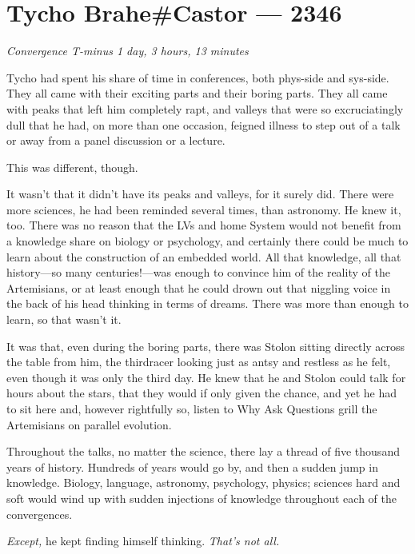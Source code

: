 \hypertarget{tycho-brahecastor-2346}{%
\chapter{Tycho Brahe\#Castor — 2346}}

\begin{center}
\emph{Convergence T-minus 1 day, 3 hours, 13 minutes}
\end{center}

\noindent Tycho had spent his share of time in conferences, both phys-side and sys-side. They all came with their exciting parts and their boring parts. They all came with peaks that left him completely rapt, and valleys that were so excruciatingly dull that he had, on more than one occasion, feigned illness to step out of a talk or away from a panel discussion or a lecture.

This was different, though.

It wasn't that it didn't have its peaks and valleys, for it surely did. There were more sciences, he had been reminded several times, than astronomy. He knew it, too. There was no reason that the LVs and home System would not benefit from a knowledge share on biology or psychology, and certainly there could be much to learn about the construction of an embedded world. All that knowledge, all that history—so many centuries!—was enough to convince him of the reality of the Artemisians, or at least enough that he could drown out that niggling voice in the back of his head thinking in terms of dreams. There was more than enough to learn, so that wasn't it.

It was that, even during the boring parts, there was Stolon sitting directly across the table from him, the thirdracer looking just as antsy and restless as he felt, even though it was only the third day. He knew that he and Stolon could talk for hours about the stars, that they would if only given the chance, and yet he had to sit here and, however rightfully so, listen to Why Ask Questions grill the Artemisians on parallel evolution.

Throughout the talks, no matter the science, there lay a thread of five thousand years of history. Hundreds of years would go by, and then a sudden jump in knowledge. Biology, language, astronomy, psychology, physics; sciences hard and soft would wind up with sudden injections of knowledge throughout each of the convergences.

\emph{Except,} he kept finding himself thinking. \emph{That's not all.}

